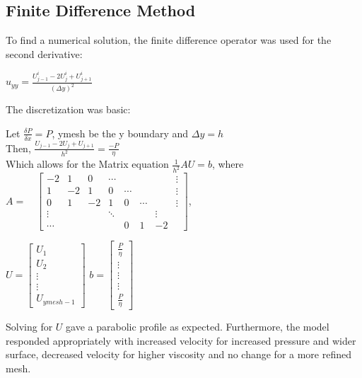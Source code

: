 \documentclass{article}
\begin{document}
\subsection{Finite Difference Method}
	 To find a numerical solution, the finite difference operator was used for the second derivative:
	 \begin{center}
	 	$u_{yy}=\frac {U^{i}_{j-1}-2U^{i}_{j}+U^{i}_{j+1}}{(\Delta y)^{2}}$
	 \end{center}
	The discretization was basic:
		
	 Let $\frac{\delta P}{\delta x}=P$, ymesh be the y boundary and $\Delta y=h$\\
	Then, $\frac{U_{j-1}-2U_{j}+U_{j+1}}{h^{2}}=\frac{-P}{\eta}$\\
	Which allows for the Matrix equation $\frac{1}{h^{2}}AU=b$, where\\
	$A=
	\quad
	\begin{bmatrix}
	-2 & 1 & 0 &\cdots && &&\vdots\\
	1 & -2 & 1 &0 &\cdots&&&\vdots\\
	0 & 1 & -2 & 1 & 0 &\cdots&&\vdots\\
	\vdots&&&\ddots&&&\vdots\\
	\cdots &&&& 0 & 1 & -2
	\end{bmatrix}$,
	
	$U=
	\begin{bmatrix}
	U_1\\
	U_2\\
	\vdots\\
	\vdots\\
	U_{ymesh-1}
	\end{bmatrix}
	$
	$b=
	\begin{bmatrix}
	\frac{P}{\eta}\\
	\vdots\\
	\vdots\\	
	\vdots\\
	\frac{P}{\eta}
	\end{bmatrix}$

Solving for $U$ gave a parabolic profile as expected.
Furthermore, the model responded appropriately with increased velocity for increased pressure and wider surface, decreased velocity for higher viscosity and no change for a more refined mesh.
\end{document}
